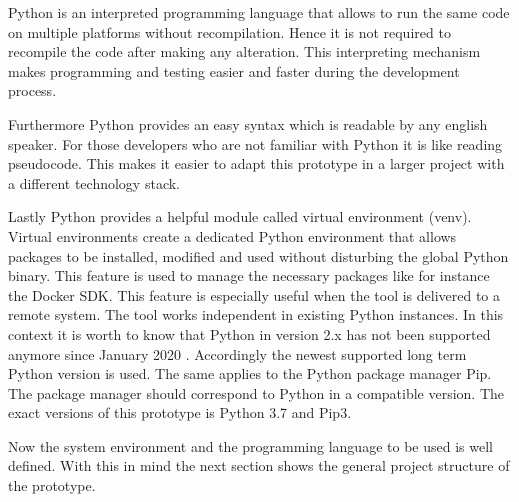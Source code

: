 Python is an interpreted programming language that allows to run the same code on multiple platforms without recompilation. 
Hence it is not required to recompile the code after making any alteration. 
This interpreting mechanism makes programming and testing easier and faster during the development process.

Furthermore Python provides an easy syntax which is readable by any english speaker. 
For those developers who are not familiar with Python it is like reading pseudocode. 
This makes it easier to adapt this prototype in a larger project with a different technology stack.

Lastly Python provides a helpful module called virtual environment (venv). 
Virtual environments create a dedicated Python environment that allows packages to be installed, modified and used without disturbing the global Python binary. 
This feature is used to manage the necessary packages like for instance the Docker SDK. 
This feature is especially useful when the tool is delivered to a remote system. 
The tool works independent in existing Python instances. 
In this context it is worth to know that Python in version 2.x has not been supported anymore since January 2020 \cite{python_deprecated}. 
Accordingly the newest supported long term Python version is used. 
The same applies to the Python package manager Pip. 
The package manager should correspond to Python in a compatible version. 
The exact versions of this prototype is Python 3.7 and Pip3.

Now the system environment and the programming language to be used is well defined. 
With this in mind the next section shows the general project structure of the prototype.
